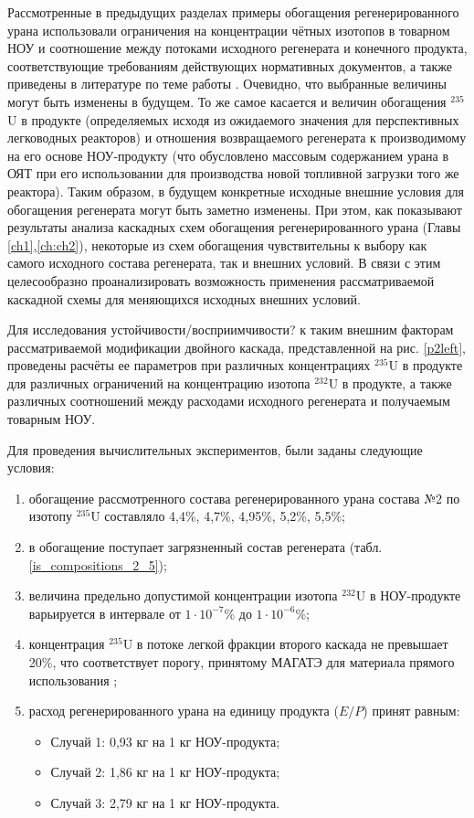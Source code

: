 Рассмотренные в предыдущих разделах примеры обогащения регенерированного урана использовали ограничения на концентрации чётных изотопов в товарном НОУ и соотношение между потоками исходного регенерата и конечного продукта, соответствующие требованиям действующих нормативных документов, а также приведены в литературе по теме работы \cite{smirnovKaskadnyeShemyZadachah2012}. Очевидно, что выбранные величины могут быть изменены в будущем. То же самое касается и величин обогащения $^{235}$U в продукте (определяемых исходя из ожидаемого значения для перспективных легководных реакторов) и отношения возвращаемого регенерата к производимому на его основе НОУ-продукту (что обусловлено массовым содержанием урана в ОЯТ при его использовании для производства новой топливной загрузки того же реактора). Таким образом, в будущем конкретные исходные внешние условия для обогащения регенерата могут быть заметно изменены. При этом, как показывают результаты анализа каскадных схем обогащения регенерированного урана (Главы \ref{ch1},\ref{ch:ch2}), некоторые из схем обогащения чувствительны к выбору как самого исходного состава регенерата, так и внешних условий. В связи с этим целесообразно проанализировать возможность применения рассматриваемой каскадной схемы для меняющихся исходных внешних условий.

Для исследования устойчивости/восприимчивости? к таким внешним факторам рассматриваемой модификации двойного каскада, представленной на рис. \ref{p2left}, проведены расчёты ее параметров при различных концентрациях $^{235}$U в продукте для различных ограничений на концентрацию изотопа $^{232}$U в продукте, а также различных соотношений между расходами исходного регенерата и получаемым товарным НОУ.

Для проведения вычислительных экспериментов, были заданы следующие условия:

\begin{enumerate}
    \item обогащение рассмотренного состава регенерированного урана состава №2 по изотопу $^{235}$U составляло 4,4\%, 4,7\%, 4,95\%, 5,2\%, 5,5\%;
    \item в обогащение поступает загрязненный состав регенерата (табл. \ref{is_compositions_2_5});    
    \item величина предельно допустимой концентрации изотопа $^{232}$U в НОУ-продукте варьируется в интервале от $1\cdot10^{-7}$\% до $1\cdot10^{-6}$\%;
    \item концентрация $^{235}$U в потоке легкой фракции второго каскада не превышает 20\%, что соответствует порогу, принятому МАГАТЭ для материала прямого использования \cite{alekseevConceptUseRecycled2010};
    \item расход регенерированного урана на единицу продукта ($E/P$) принят равным:
    \begin{itemize}
        \item Случай 1: 0,93 кг на 1 кг НОУ-продукта;
        \item Случай 2: 1,86 кг на 1 кг НОУ-продукта;
        \item Случай 3: 2,79 кг на 1 кг НОУ-продукта.
    \end{itemize}
\end{enumerate}

